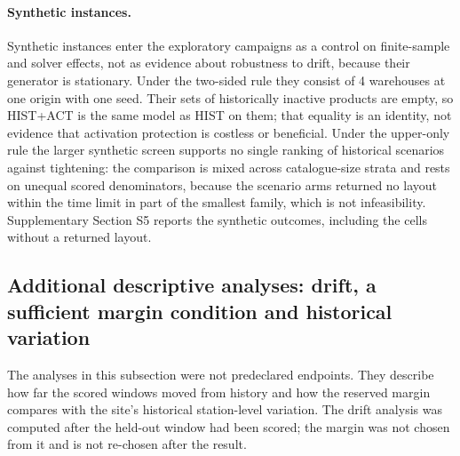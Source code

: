 \paragraph{Synthetic instances.} Synthetic instances enter the exploratory campaigns as a control on finite-sample and solver effects, not as evidence about robustness to drift, because their generator is stationary. Under the two-sided rule they consist of 4 warehouses at one origin with one seed. Their sets of historically inactive products are empty, so HIST+ACT is the same model as HIST on them; that equality is an identity, not evidence that activation protection is costless or beneficial. Under the upper-only rule the larger synthetic screen supports no single ranking of historical scenarios against tightening: the comparison is mixed across catalogue-size strata and rests on unequal scored denominators, because the scenario arms returned no layout within the time limit in part of the smallest family, which is not infeasibility. Supplementary Section S5 reports the synthetic outcomes, including the cells without a returned layout.

\subsection{Additional descriptive analyses: drift, a sufficient margin condition and historical variation}\label{subsec:descriptive}
The analyses in this subsection were not predeclared endpoints. They describe how far the scored windows moved from history and how the reserved margin compares with the site's historical station-level variation. The drift analysis was computed after the held-out window had been scored; the margin was not chosen from it and is not re-chosen after the result.

